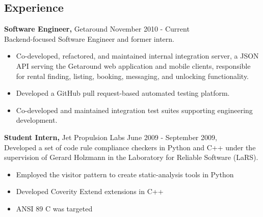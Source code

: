 \documentclass[margin]{res}
\begin{document}
 
 
\address{{\bf Current Address} \\ 1355 Harrison St.\\ San Francisco, CA 94103}
\address{{\bf Contact Information} \\ Mobile: \space \space (760) 994-9051\\Email: \space \space \space michael@mvanveen.net\\Website: \space mvanveen.net \\Blog: \space \space \space \space mvv.io}
\begin{resume} 
 
\section{Experience}
  {\bf Software Engineer,} Getaround \hfill November 2010 - Current \\
  Backend-focused Software Engineer and former intern.
  \begin{itemize}
    \item Co-developed, refactored, and maintained internal integration server, a JSON API serving the Getaround web application and mobile clients, responsible for rental finding, listing, booking, messaging, and unlocking functionality.
    \item Developed a GitHub pull request-based automated testing platform.
    \item Co-developed and maintained integration test suites supporting engineering development.
  \end{itemize}

{\bf Student Intern,} Jet Propulsion Labs \hfill June 2009 - September 2009, \\
 Developed a set of code rule compliance checkers in Python and C++ under the supervision of Gerard Holzmann in the Laboratory for Reliable Software (LaRS).
 \begin{itemize}
 \item Employed the visitor pattern to create static-analysis tools in Python
 \item Developed Coverity Extend extensions in C++
 \item ANSI 89 C was targeted
 \end{itemize}


\end{resume}
\end{document}
